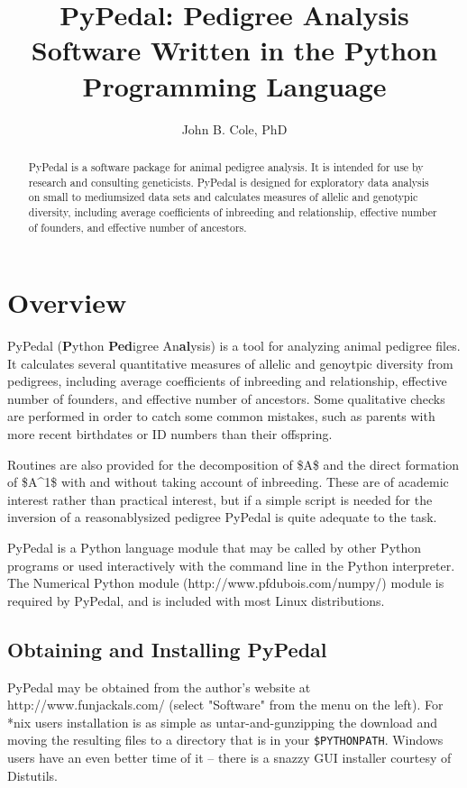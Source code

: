 
\title{PyPedal: Pedigree Analysis Software Written in the Python Programming Language}
\author{John B. Cole, PhD}
\maketitle

\begin{abstract}
PyPedal is a software package for animal pedigree analysis. It is intended
for use by research and consulting geneticists. PyPedal is designed for
exploratory data analysis on small to mediumsized data sets and calculates
measures of allelic and genotypic diversity, including average coefficients of
inbreeding and relationship, effective number of founders, and effective number
of ancestors.
\end{abstract}

\section{Overview}
PyPedal (\textbf{P}ython \textbf{Ped}igree An\textbf{al}ysis) is a tool for analyzing animal pedigree files.  It calculates several quantitative measures of allelic and genoytpic diversity from pedigrees, including average coefficients of inbreeding and relationship, effective number of founders, and effective number of ancestors.  Some qualitative checks are performed in order to catch some common mistakes, such as parents with more recent birthdates or ID numbers than their offspring.

Routines are also provided for the decomposition of \$A\$ and the direct formation of \$A\^{}{1}\$ with and without taking account of inbreeding.  These are of academic interest rather than practical interest, but if a simple script is needed for the inversion of a reasonablysized pedigree PyPedal is quite adequate to the task.

PyPedal is a Python language module that may be called by other Python programs or used interactively with the command line in the Python interpreter.  The Numerical Python module (http://www.pfdubois.com/numpy/) module is required by PyPedal, and is included with most Linux distributions.

\subsection{Obtaining and Installing PyPedal}
PyPedal may be obtained from the author's website at http://www.funjackals.com/ (select "Software" from the menu on the left).  For *nix users installation is as simple as untar-and-gunzipping the download and moving the resulting files to a directory that is in your \texttt{\$PYTHONPATH}.  Windows users have an even better time of it -- there is a snazzy GUI installer courtesy of Distutils.


